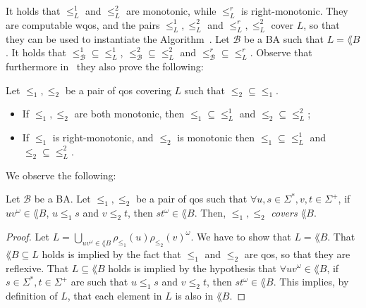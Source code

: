 It holds that $\leq_{L}^1$ and $\leq_{L}^2$ are monotonic, while
$\leq_{L}^r$ is right-monotonic.
They are computable wqos,
and the pairs $\leq_{L}^1, \leq_{L}^2$ and
$\leq_{L}^r, \leq_{L}^2$ cover $L$, so that they can
be used to instantiate the Algorithm~.
Let $\mathcal{B}$ be a BA such that $L = \lang{B}$.
It holds that
$\mathord{\leq^1_{\mathcal{B}}} \subseteq \mathord{\leq^1_L}$,
$\mathord{\leq^2_{\mathcal{B}}} \subseteq \mathord{\leq^2_L}$ and
$\mathord{\leq^r_{\mathcal{B}}} \subseteq \mathord{\leq^r_L}$.
Observe that furthermore in~\cite{ganty2020omegalang} they also prove the following:

\begin{proposition}
\label{proposition:synt-largest}
Let $\leq_1,\leq_2$ be a pair of qos covering $L$ such that $\mathord{\leq_2} \subseteq \mathord{\leq_1}$.
\begin{itemize}
\item If $\leq_1, \leq_2$ are both monotonic, then $\mathord{\leq_1} \subseteq \mathord{\leq^1_L}$
and $\mathord{\leq_2} \subseteq \mathord{\leq^2_L}$;
\item If $\leq_1$ is right-monotonic, and $\leq_2$ is monotonic then
$\mathord{\leq_1} \subseteq \mathord{\leq^1_L}$
and $\mathord{\leq_2} \subseteq \mathord{\leq^2_L}$.
\end{itemize}
\end{proposition}

We observe the following:
\begin{proposition}
\label{prop:forall-stronger-coverage}
Let $\mathcal{B}$ be a BA.
Let $\leq_1,\leq_2$ be a pair of qos such that
$\forall u,s \in \Sigma^*, v,t \in \Sigma^+$, if
$uv ^{\omega} \in \lang{B}$, $u \leq_1 s$ and $v \leq_2 t$,
then $st ^{\omega} \in \lang{B}$.
Then, $\leq_1,\leq_2$ \emph{covers} $\lang{B}$.
\end{proposition}

\begin{proof}
Let $L = \bigcup_{uv ^{\omega} \in \lang{B}} \rho_{\leq_1}(u) \rho_{\leq_2}(v)^{\omega}$.
We have to show that $L = \lang{B}$.
That $\lang{B} \subseteq L$ holds is implied by the fact that $\leq_1$ and $\leq_2$
are qos, so that they are reflexive.
That $L \subseteq \lang{B}$ holds is implied by the hypothesis
that $\forall uv ^{\omega} \in \lang{B}$, if $s \in \Sigma^*, t \in \Sigma^+$
are such that $u \leq_1 s$ and $v \leq_2 t$, then $st ^{\omega} \in \lang{B}$.
This implies, by definition of $L$, that each element in $L$ is also in $\lang{B}$.
\end{proof}


